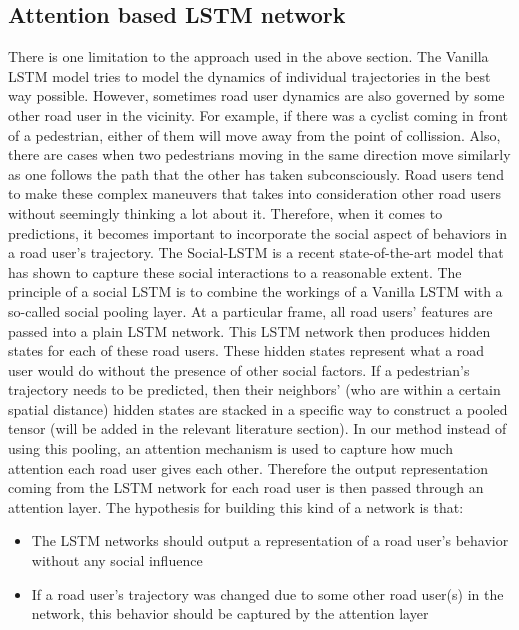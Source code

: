 \documentclass{article}
\begin{document}
\subsection{Attention based LSTM network}\label{ssec:tlstm}
There is one limitation to the approach used in the above section. The Vanilla LSTM model tries to model the dynamics of individual trajectories in the best way possible. However, sometimes road user dynamics are also governed by some other road user in the vicinity. For example, if there was a cyclist coming in front of a pedestrian, either of them will move away from the point of collission. Also, there are cases when two pedestrians moving in the same direction move similarly as one follows the path that the other has taken subconsciously. Road users tend to make these complex maneuvers that takes into consideration other road users without seemingly thinking a lot about it. Therefore, when it comes to predictions, it becomes important to incorporate the social aspect of behaviors in a road user's trajectory. The Social-LSTM is a recent state-of-the-art model that has shown to capture these social interactions to a reasonable extent. The principle of a social LSTM is to combine the workings of a Vanilla LSTM with a so-called social pooling layer. At a particular frame, all road users' features are passed into a plain LSTM network. This LSTM network then produces hidden states for each of these road users. These hidden states represent what a road user would do without the presence of other social factors.  If a pedestrian's trajectory needs to be predicted, then their neighbors' (who are within a certain spatial distance) hidden states are stacked in a specific way to construct a pooled tensor (will be added in the relevant literature section). In our method instead of using this pooling, an attention mechanism is used to capture how much attention each road user gives each other. Therefore the output representation coming from the LSTM network for each road user is then passed through an attention layer. The hypothesis for building this kind of a network is that:
\begin{itemize}
    \item The LSTM networks should output a representation of a road user's behavior without any social influence
    \item If a road user's trajectory was changed due to some other road user(s) in the network, this behavior should be captured by the attention layer 
\end{itemize}
\end{document}
